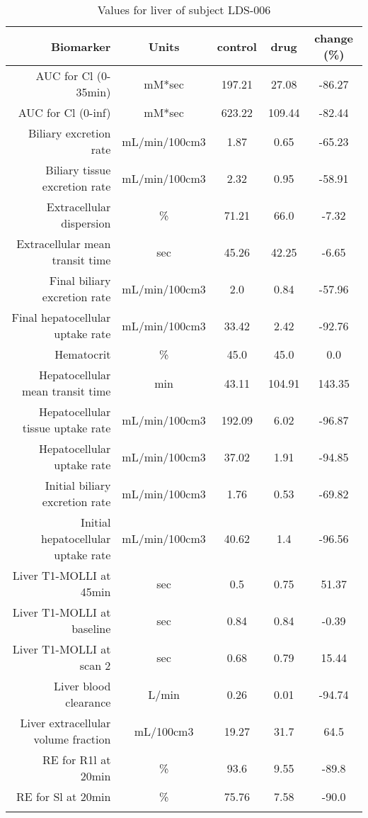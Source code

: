 \documentclass{epflreport}%
\begin{document}
%
\clearpage%
\begin{longtable}{rcccc}%
\hline%
Biomarker&Units&control&drug&change (\%)\\%
\hline%
AUC for Cl (0{-}35min)&mM*sec&197.21&27.08&{-}86.27\\%
AUC for Cl (0{-}inf)&mM*sec&623.22&109.44&{-}82.44\\%
Biliary excretion rate&mL/min/100cm3&1.87&0.65&{-}65.23\\%
Biliary tissue excretion rate&mL/min/100cm3&2.32&0.95&{-}58.91\\%
Extracellular dispersion&\%&71.21&66.0&{-}7.32\\%
Extracellular mean transit time&sec&45.26&42.25&{-}6.65\\%
Final biliary excretion rate&mL/min/100cm3&2.0&0.84&{-}57.96\\%
Final hepatocellular uptake rate&mL/min/100cm3&33.42&2.42&{-}92.76\\%
Hematocrit&\%&45.0&45.0&0.0\\%
Hepatocellular mean transit time&min&43.11&104.91&143.35\\%
Hepatocellular tissue uptake rate&mL/min/100cm3&192.09&6.02&{-}96.87\\%
Hepatocellular uptake rate&mL/min/100cm3&37.02&1.91&{-}94.85\\%
Initial biliary excretion rate&mL/min/100cm3&1.76&0.53&{-}69.82\\%
Initial hepatocellular uptake rate&mL/min/100cm3&40.62&1.4&{-}96.56\\%
Liver T1{-}MOLLI at 45min&sec&0.5&0.75&51.37\\%
Liver T1{-}MOLLI at baseline&sec&0.84&0.84&{-}0.39\\%
Liver T1{-}MOLLI at scan 2&sec&0.68&0.79&15.44\\%
Liver blood clearance&L/min&0.26&0.01&{-}94.74\\%
Liver extracellular volume fraction&mL/100cm3&19.27&31.7&64.5\\%
RE for R1l at 20min&\%&93.6&9.55&{-}89.8\\%
RE for Sl at 20min&\%&75.76&7.58&{-}90.0\\%
\hline%
\caption{Values for liver of subject LDS-006} \\%
\end{longtable}%
\end{document}
